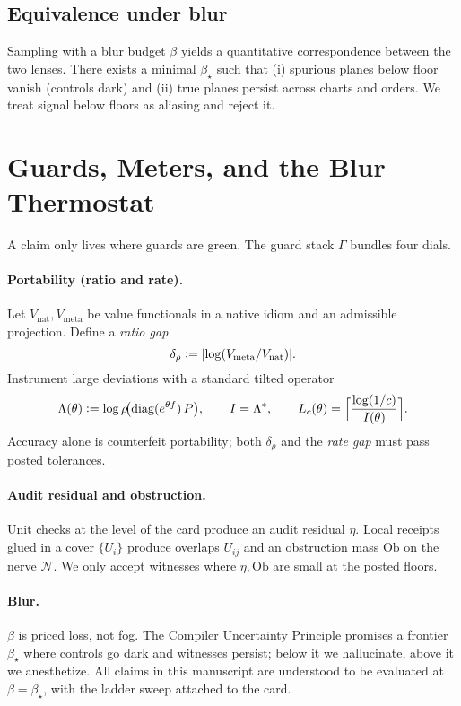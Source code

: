 \documentclass[11pt]{article}
\newcommand{\1}{\mathbf{1}}
\newcommand{\diag}{\mathrm{diag}}
\newcommand{\defeq}{\vcentcolon=}
\newcommand{\Guard}{\Gamma}
\newcommand{\ratio}{\rho}
\newcommand{\rate}{I}
\newcommand{\Blur}{\beta}
\newcommand{\Lc}{L_c}
\newcommand{\LambdaCGF}{\Lambda}
\newcommand{\Ob}{\mathrm{Ob}}
\newcommand{\Nerve}{\mathcal{N}}
\begin{document}
\subsection{Equivalence under blur}
Sampling with a blur budget \(\Blur\) yields a quantitative correspondence between the two lenses. There exists a minimal \(\Blur_\star\) such that (i) spurious planes below floor vanish (controls dark) and (ii) true planes persist across charts and orders. We treat signal below floors as aliasing and reject it.

\section{Guards, Meters, and the Blur Thermostat}
A claim only lives where guards are green. The guard stack \(\Guard\) bundles four dials.

\paragraph{Portability (ratio and rate).}
Let \(V_{\mathrm{nat}},V_{\mathrm{meta}}\) be value functionals in a native idiom and an admissible projection. Define a \emph{ratio gap}
\[
\delta_{\ratio} \defeq \abs{\log(V_{\mathrm{meta}}/V_{\mathrm{nat}})}.
\]
Instrument large deviations with a standard tilted operator
\begin{equation}
\LambdaCGF(\theta)\defeq \log \rho\!\big(\diag(e^{\theta f})\,P\big),\qquad 
\rate=\LambdaCGF^\ast, \qquad 
\Lc(\theta) = \Big\lceil \frac{\log(1/c)}{\rate(\theta)} \Big\rceil.
\end{equation}
Accuracy alone is counterfeit portability; both \(\delta_{\ratio}\) and the \emph{rate gap} must pass posted tolerances.

\paragraph{Audit residual and obstruction.}
Unit checks at the level of the card produce an audit residual \(\eta\). Local receipts glued in a cover \(\{U_i\}\) produce overlaps \(U_{ij}\) and an obstruction mass \(\Ob\) on the nerve \(\Nerve\). We only accept witnesses where \(\eta,\Ob\) are small at the posted floors.

\paragraph{Blur.}
\(\Blur\) is priced loss, not fog. The Compiler Uncertainty Principle promises a frontier \(\Blur_\star\) where controls go dark and witnesses persist; below it we hallucinate, above it we anesthetize. All claims in this manuscript are understood to be evaluated at \(\Blur=\Blur_\star\), with the ladder sweep attached to the card.
\end{document}
